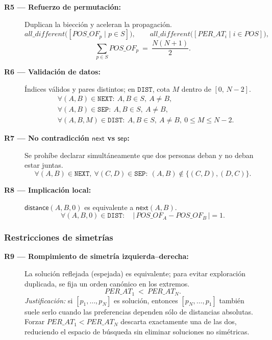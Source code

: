 \begin{description}
  \item[\textbf{R5 — Refuerzo de permutación:}] Duplican la biección y aceleran la propagación.
  \[
    \textit{all\_different}\big([POS\_OF_p\mid p\in S]\big),\qquad
    \textit{all\_different}\big([PER\_AT_i\mid i\in POS]\big),
  \]
  \[
    \sum_{p\in S} POS\_OF_p\ =\ \frac{N(N+1)}{2}.
  \]

  \item[\textbf{R6 — Validación de datos:}] Índices válidos y pares distintos; en \(\texttt{DIST}\), cota \(M\) dentro de \([0,\,N\!-\!2]\).
  \[
    \begin{aligned}
      &\forall (A,B)\in \texttt{NEXT}:\ A,B\in S,\ A\ne B,\\
      &\forall (A,B)\in \texttt{SEP}:\ A,B\in S,\ A\ne B,\\
      &\forall (A,B,M)\in \texttt{DIST}:\ A,B\in S,\ A\ne B,\ 0\le M\le N-2.
    \end{aligned}
  \]

  \item[\textbf{R7 — No contradicción \(\textsf{next}\) vs \(\textsf{sep}\):}] Se prohíbe declarar simultáneamente que dos personas deban y no deban estar juntas.
  \[
    \forall (A,B)\in \texttt{NEXT},\ \forall (C,D)\in \texttt{SEP}:\ (A,B)\not\in\{(C,D),(D,C)\}.
  \]

  \item[\textbf{R8 — Implicación local:}] \(\textsf{distance}(A,B,0)\) es equivalente a \(\textsf{next}(A,B)\).
  \[
    \forall (A,B,0)\in \texttt{DIST}:\quad \big|\,POS\_OF_A - POS\_OF_B\,\big| = 1.
  \]
\end{description}

\subsubsection*{Restricciones de simetrías}

\begin{description}
  \item[\textbf{R9 — Rompimiento de simetría izquierda–derecha:}] La solución reflejada (espejada) es equivalente; para evitar exploración duplicada, se fija un orden canónico en los extremos.
  \[
    PER\_AT_1 \ <\ PER\_AT_N.
  \]
  \emph{Justificación:} si \([p_1,\dots,p_N]\) es solución, entonces \([p_N,\dots,p_1]\) también suele serlo cuando las preferencias dependen sólo de distancias absolutas. Forzar \(PER\_AT_1<PER\_AT_N\) descarta exactamente una de las dos, reduciendo el espacio de búsqueda sin eliminar soluciones no simétricas.
\end{description}

